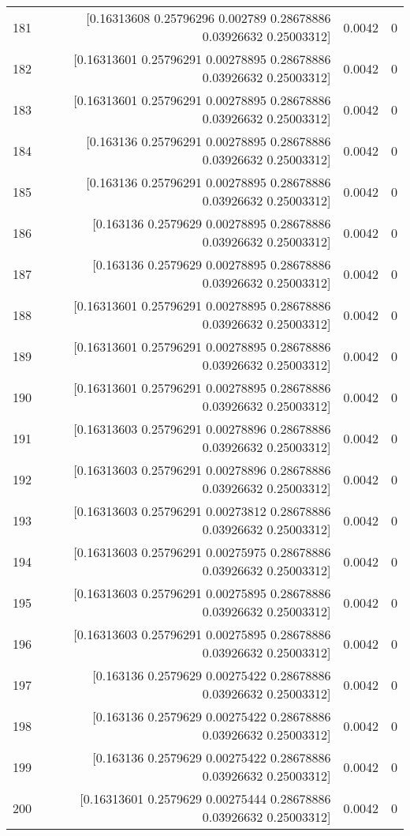 \begin{longtable}{lrrr}
181 & [0.16313608 0.25796296 0.002789   0.28678886 0.03926632 0.25003312] & 0.0042 & 0 \\
182 & [0.16313601 0.25796291 0.00278895 0.28678886 0.03926632 0.25003312] & 0.0042 & 0 \\
183 & [0.16313601 0.25796291 0.00278895 0.28678886 0.03926632 0.25003312] & 0.0042 & 0 \\
184 & [0.163136   0.25796291 0.00278895 0.28678886 0.03926632 0.25003312] & 0.0042 & 0 \\
185 & [0.163136   0.25796291 0.00278895 0.28678886 0.03926632 0.25003312] & 0.0042 & 0 \\
186 & [0.163136   0.2579629  0.00278895 0.28678886 0.03926632 0.25003312] & 0.0042 & 0 \\
187 & [0.163136   0.2579629  0.00278895 0.28678886 0.03926632 0.25003312] & 0.0042 & 0 \\
188 & [0.16313601 0.25796291 0.00278895 0.28678886 0.03926632 0.25003312] & 0.0042 & 0 \\
189 & [0.16313601 0.25796291 0.00278895 0.28678886 0.03926632 0.25003312] & 0.0042 & 0 \\
190 & [0.16313601 0.25796291 0.00278895 0.28678886 0.03926632 0.25003312] & 0.0042 & 0 \\
191 & [0.16313603 0.25796291 0.00278896 0.28678886 0.03926632 0.25003312] & 0.0042 & 0 \\
192 & [0.16313603 0.25796291 0.00278896 0.28678886 0.03926632 0.25003312] & 0.0042 & 0 \\
193 & [0.16313603 0.25796291 0.00273812 0.28678886 0.03926632 0.25003312] & 0.0042 & 0 \\
194 & [0.16313603 0.25796291 0.00275975 0.28678886 0.03926632 0.25003312] & 0.0042 & 0 \\
195 & [0.16313603 0.25796291 0.00275895 0.28678886 0.03926632 0.25003312] & 0.0042 & 0 \\
196 & [0.16313603 0.25796291 0.00275895 0.28678886 0.03926632 0.25003312] & 0.0042 & 0 \\
197 & [0.163136   0.2579629  0.00275422 0.28678886 0.03926632 0.25003312] & 0.0042 & 0 \\
198 & [0.163136   0.2579629  0.00275422 0.28678886 0.03926632 0.25003312] & 0.0042 & 0 \\
199 & [0.163136   0.2579629  0.00275422 0.28678886 0.03926632 0.25003312] & 0.0042 & 0 \\
200 & [0.16313601 0.2579629  0.00275444 0.28678886 0.03926632 0.25003312] & 0.0042 & 0 \\

\end{longtable}
